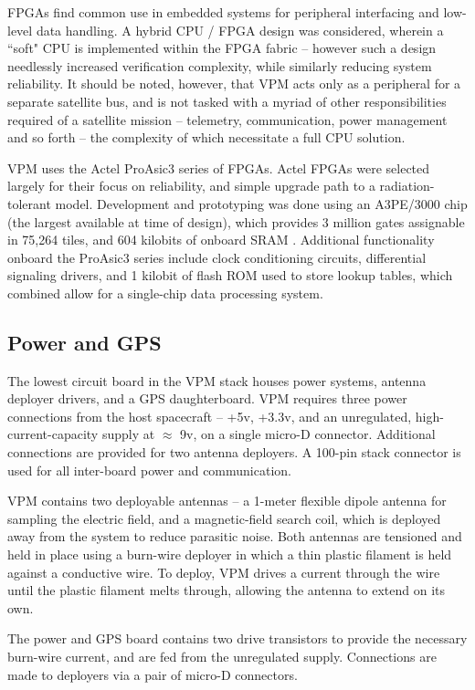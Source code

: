 FPGAs find common use in embedded systems for peripheral interfacing and low-level data handling. A hybrid CPU / FPGA design was considered, wherein a ``soft" CPU is implemented within the FPGA fabric -- however such a design needlessly increased verification complexity, while similarly reducing system reliability. It should be noted, however, that VPM acts only as a peripheral for a separate satellite bus, and is not tasked with a myriad of other responsibilities required of a satellite mission -- telemetry, communication, power management and so forth -- the complexity of which necessitate a full CPU solution.

VPM uses the Actel ProAsic3 series of FPGAs. Actel FPGAs were selected largely for their focus on reliability, and simple upgrade path to a radiation-tolerant model. Development and prototyping was done using an A3PE/3000 chip (the largest available at time of design), which provides 3 million gates assignable in 75,264 tiles, and 604 kilobits of onboard SRAM . Additional functionality onboard the ProAsic3 series include clock conditioning circuits, differential signaling drivers, and 1 kilobit of flash ROM used to store lookup tables, which combined allow for a single-chip data processing system. %


\subsection{Power and GPS}
The lowest circuit board in the VPM stack houses power systems, antenna deployer drivers, and a GPS daughterboard. VPM requires three power connections from the host spacecraft -- +5v, +3.3v, and an unregulated, high-current-capacity supply at $\approx$ 9v, on a single micro-D connector. Additional connections are provided for two antenna deployers. A 100-pin stack connector is used for all inter-board power and communication.

VPM contains two deployable antennas -- a 1-meter flexible dipole antenna for sampling the electric field, and a magnetic-field search coil, which is deployed away from the system to reduce parasitic noise. Both antennas are tensioned and held in place using a burn-wire deployer in which a thin plastic filament is held against a conductive wire. To deploy, VPM drives a current through the wire until the plastic filament melts through, allowing the  antenna to extend on its own.

The power and GPS board contains two drive transistors to provide the necessary burn-wire current, and are fed from the unregulated supply. Connections are made to deployers via a pair of micro-D connectors.

